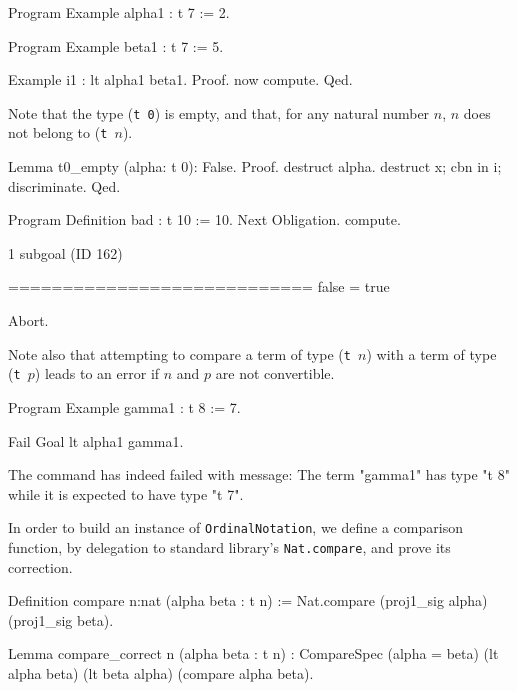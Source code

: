 
\begin{Coqsrc}
Program Example alpha1 : t 7 := 2.

Program Example beta1 : t 7 := 5.

Example i1 : lt  alpha1 beta1.
Proof. now compute. Qed.
\end{Coqsrc}




Note that the type (\texttt{t 0}) is empty, and that, for any natural number
 $n$, $n$ does not belong to (\texttt{t $n$}).

\begin{Coqsrc}
Lemma t0_empty (alpha: t 0): False.
Proof.
  destruct alpha.
  destruct x; cbn in i; discriminate.
Qed.


Program Definition bad : t 10 := 10.
Next Obligation.
  compute.
\end{Coqsrc}

\begin{Coqanswer}
1 subgoal (ID 162)
  
  ============================
  false = true
\end{Coqanswer}

\begin{Coqsrc}
Abort.
\end{Coqsrc}

Note also that attempting to compare a term  of type (\texttt{t $n$}) with a term of
type (\texttt{t $p$})  leads to an error if $n$ and $p$ are not convertible.

\begin{Coqsrc}

Program Example gamma1 : t 8 := 7.

Fail Goal lt alpha1 gamma1.
\end{Coqsrc}

\begin{Coqanswer}
 The command has indeed failed with message:
The term "gamma1" has type "t 8" while it is expected to have type "t 7".
\end{Coqanswer}


In order to build an instance of \texttt{OrdinalNotation}, we define a comparison function, by delegation to standard library's  \texttt{Nat.compare}, and prove its correction.

\begin{Coqsrc}
Definition compare {n:nat} (alpha beta : t n) :=
  Nat.compare (proj1_sig alpha) (proj1_sig beta).

Lemma compare_correct {n} (alpha beta : t n) :
  CompareSpec (alpha = beta) (lt alpha beta) (lt beta alpha)
              (compare alpha beta).
\end{Coqsrc}

